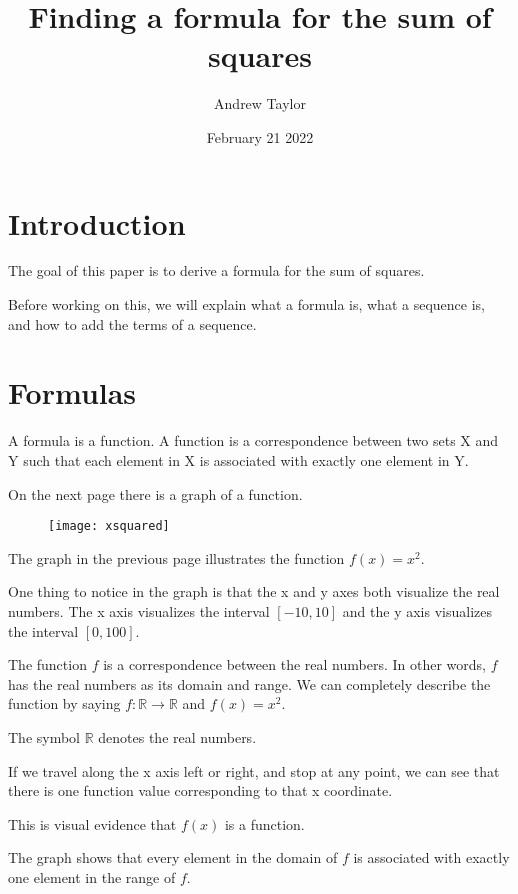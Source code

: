 \documentclass{article}
\title{Finding a formula for the sum of squares}
\author{Andrew Taylor}
\date{February 21 2022}
\begin{document}
\maketitle
\section{Introduction}
\begin{flushleft}
The goal of this paper is to derive a formula for the sum of squares. 
\end{flushleft}
\begin{flushleft}
Before working on this, we will explain what a formula is, what a sequence is, and how to add the terms of a sequence.
\end{flushleft}
\section{Formulas}
\begin{flushleft}
A formula is a function. A function is a correspondence between two sets X and Y such that each element in X is associated with exactly one element in Y.
\end{flushleft}
\begin{flushleft}
On the next page there is a graph of a function.
\end{flushleft}
\begin{figure}
\centering
\texttt{[image: xsquared]}
\end{figure}
\clearpage
\begin{flushleft}
The graph in the previous page illustrates the function $f(x) = x^2$. 
\end{flushleft}
\begin{flushleft}
One thing to notice in the graph is that the x and y axes both visualize the real numbers. The x axis visualizes the interval $[-10, 10]$ and the y axis visualizes the interval $[0, 100]$.
\end{flushleft}
\begin{flushleft}
The function $f$ is a correspondence between the real numbers. In other words, $f$ has the real numbers as its domain and range. We can completely describe the function by saying $f : \mathbb{R} \rightarrow \mathbb{R}$ and $f(x) = x^2$.
\end{flushleft}
\begin{flushleft}
The symbol $\mathbb{R}$ denotes the real numbers.
\end{flushleft}
\begin{flushleft}
If we travel along the x axis left or right, and stop at any point, we can see that there is one function value corresponding to that x coordinate. 
\end{flushleft}
\begin{flushleft}
This is visual evidence that $f(x)$ is a function.
\end{flushleft}
\begin{flushleft}
The graph shows that every element in the domain of $f$ is associated with exactly one element in the range of $f$.
\end{flushleft}
\end{document}

